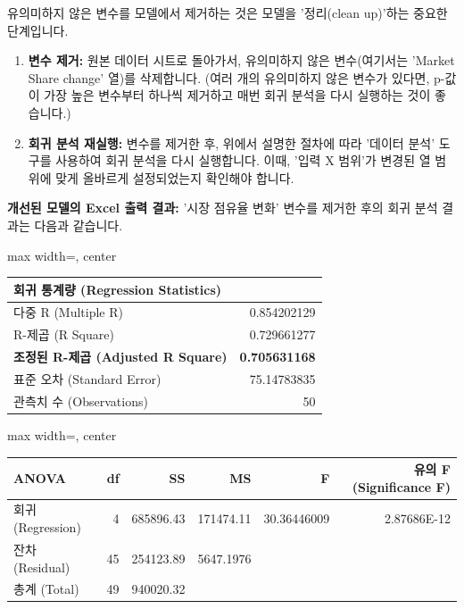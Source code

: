 \documentclass[11pt,a4paper]{article}
\theoremstyle{definition}
\begin{document}
\begin{tcolorbox}[title=\textbf{모델 정리: 유의미하지 않은 변수 제거}]
유의미하지 않은 변수를 모델에서 제거하는 것은 모델을 '정리(clean up)'하는 중요한 단계입니다.
\begin{enumerate}
    \item \textbf{변수 제거:} 원본 데이터 시트로 돌아가서, 유의미하지 않은 변수(여기서는 'Market Share change' 열)를 삭제합니다. (여러 개의 유의미하지 않은 변수가 있다면, p-값이 가장 높은 변수부터 하나씩 제거하고 매번 회귀 분석을 다시 실행하는 것이 좋습니다.)
    \item \textbf{회귀 분석 재실행:} 변수를 제거한 후, 위에서 설명한 절차에 따라 '데이터 분석' 도구를 사용하여 회귀 분석을 다시 실행합니다. 이때, '입력 X 범위'가 변경된 열 범위에 맞게 올바르게 설정되었는지 확인해야 합니다.
\end{enumerate}

\textbf{개선된 모델의 Excel 출력 결과:}
'시장 점유율 변화' 변수를 제거한 후의 회귀 분석 결과는 다음과 같습니다.

\begin{adjustbox}{max width=\textwidth, center}
\begin{tabular}{l r}
\toprule
\textbf{회귀 통계량 (Regression Statistics)} & \\
\midrule
다중 R (Multiple R) & 0.854202129 \\
R-제곱 (R Square) & 0.729661277 \\
\textbf{조정된 R-제곱 (Adjusted R Square)} & \textbf{0.705631168} \\
표준 오차 (Standard Error) & 75.14783835 \\
관측치 수 (Observations) & 50 \\
\bottomrule
\end{tabular}
\end{adjustbox}

\vspace{0.5em}

\begin{adjustbox}{max width=\textwidth, center}
\begin{tabular}{l r r r r r}
\toprule
\textbf{ANOVA} & \textbf{df} & \textbf{SS} & \textbf{MS} & \textbf{F} & \textbf{유의 F (Significance F)} \\
\midrule
회귀 (Regression) & 4 & 685896.43 & 171474.11 & 30.36446009 & 2.87686E-12 \\
잔차 (Residual) & 45 & 254123.89 & 5647.1976 & & \\
총계 (Total) & 49 & 940020.32 & & & \\
\bottomrule
\end{tabular}
\end{adjustbox}


\end{tcolorbox}
\end{document}
